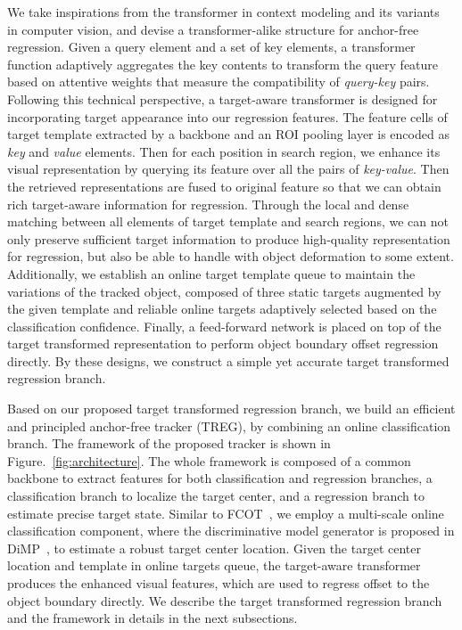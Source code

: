 \documentclass[10pt,twocolumn,letterpaper]{article}
\begin{document}
We take inspirations from the transformer in context modeling and its variants~\cite{transformer,nonlocal} in computer vision, and devise a transformer-alike structure for anchor-free regression. Given a query element and a set of key elements, a transformer function adaptively aggregates the key contents to transform the query feature based on attentive weights that measure the compatibility of \textit{query-key} pairs.
Following this technical perspective, a target-aware transformer is designed for incorporating target appearance into our regression features. The feature cells of target template extracted by a backbone and an ROI pooling layer is encoded as \textit{key} and \textit{value} elements. Then for each position in search region, we enhance its visual representation by querying its feature over all the pairs of \textit{key-value}. Then the retrieved representations are fused to original feature so that we can obtain rich target-aware information for regression.
Through the local and dense matching between all elements of target template and search regions, we can not only preserve sufficient target information to produce high-quality representation for regression, but also be able to handle with object deformation to some extent. 
Additionally, we establish an online target template queue to maintain the variations of the tracked object, composed of three static targets augmented by the given template and reliable online targets adaptively selected based on the classification confidence. 
Finally, a feed-forward network is placed on top of the target transformed representation to perform object boundary offset regression directly.
By these designs, we construct a simple yet accurate target transformed regression branch.

Based on our proposed target transformed regression branch, we build an efficient and principled anchor-free tracker (TREG), by combining an online classification branch. The framework of the proposed tracker is shown in Figure.~\ref{fig:architecture}. The whole framework is composed of a common backbone to extract features for both classification and regression branches, a classification branch to localize the target center, and a regression branch to estimate precise target state.
Similar to FCOT~\cite{fcot}, we employ a multi-scale online classification component, where the discriminative model generator is proposed in DiMP~\cite{dimp}, to estimate a robust target center location.
Given the target center location and template in online targets queue, the target-aware transformer produces the enhanced visual features, which are used to regress offset to the object boundary directly.
We describe the target transformed regression branch and the framework in details in the next subsections. 
\end{document}
